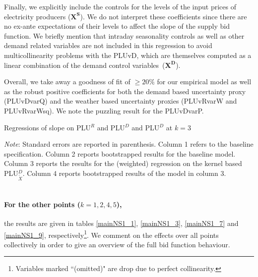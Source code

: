 Finally, we explicitly include the controls for the levels of the input prices of electricity producers ($\boldsymbol{X^S}$). We do not interpret these coefficients since there are no ex-ante expectations of their levels to affect the slope of the supply bid function. We briefly mention that intraday seasonality controls as well as other demand related variables are not included in this regression to avoid multicollinearity problems with the PLUvD, which are themselves computed as a linear combination of the demand control variables~($\boldsymbol{X^D}$). 

Overall, we take away a goodness of fit of $\geq 20\%$ for our empirical model as well as the robust positive coefficients for both the demand based uncertainty proxy (PLUvDvarQ) and the weather based uncertainty proxies (PLUvRvarW and PLUvRvarWsq). We note the puzzling result for the PLUvDvarP. 

%

\begin{table}[!ht]
\vspace{-2.38cm}

\caption{\label{main_1_5} Regressions of slope on PLU$^R$ and PLU$^{D}$ and PLU$^{D}$ at $k=3$}
\emph{Note}: Standard errors are reported in parenthesis. Column 1 refers to the baseline specification. Column 2 reports bootstrapped results for the baseline model. Column 3 reports the results for the (weighted) regression on the kernel based PLU$^D_{\tilde{X}}$. Column 4 reports bootstrapped results of the model in column 3. 
\end{table}
\pagestyle{empty}

\section*{}
\paragraph{For the other points  ($k=1,2,4,5$),} the results are given in tables \ref{mainNS1_1}, \ref{mainNS1_3}, \ref{mainNS1_7} and \ref{mainNS1_9}, respectively\footnote{Variables marked ``(omitted)" are drop due to perfect collinearity.}. We comment on the effects over all points collectively in order to give an overview of the full bid function behaviour. %

